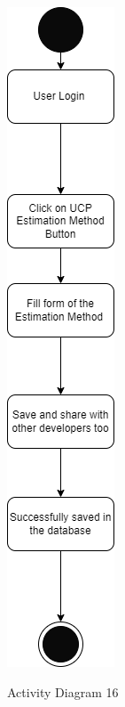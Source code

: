 \begin{figure}[H]
    \centering
    \caption{Activity Diagram 16}
    \includegraphics[scale=0.5]{./diagrams/Activity Diagram/ad-16.png}
    \label{fig:act-16}

\end{figure}


